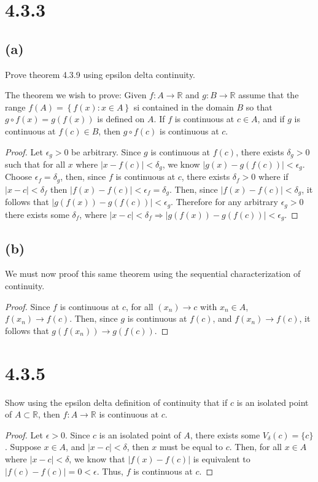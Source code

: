 \documentclass{article}
\begin{document}
\section*{4.3.3}
\subsection*{(a)}
Prove theorem 4.3.9 using epsilon delta continuity.

The theorem we wish to prove:
Given $f: A \rightarrow \mathbb{R}$ and $g: B \rightarrow \mathbb{R}$ assume that the range $f(A) = \left \{ f(x):x \in A \right \}$ si contained in the domain $B$ so that $g \circ f(x) = g(f(x))$ is defined on $A$. If $f$ is continuous at $c \in A$, and if $g$ is continuous at $f(c) \in B$, then $g \circ f(c)$ is continuous at $c$.

\begin{proof}
Let $\epsilon_g > 0$ be arbitrary. Since $g$ is continuous at $f(c)$, there exists $\delta_g > 0$ such that for all $x$ where $|x - f(c)| < \delta_g$, we know $|g(x) -g(f(c))| < \epsilon_g$. Choose $\epsilon_f = \delta_g$, then, since $f$ is continuous at $c$, there exists $\delta_f > 0$ where if $|x-c| < \delta_f$ then $|f(x)-f(c)| < \epsilon_f = \delta_g$. Then, since $|f(x)-f(c)| < \delta_g$, it follows that $|g(f(x)) -g(f(c))| < \epsilon_g$. Therefore for any arbitrary $\epsilon_g > 0$ there exists some $\delta_f$, where $|x-c| < \delta_f \Rightarrow |g(f(x)) - g(f(c))| < \epsilon_g$.
\end{proof}

\subsection*{(b)}
We must now proof this same theorem using the sequential characterization of continuity.

\begin{proof}
Since $f$ is continuous at $c$, for all $(x_n) \rightarrow c$ with $x_n \in A$, $f(x_n) \rightarrow f(c)$. Then, since $g$ is continuous at $f(c)$, and $f(x_n) \rightarrow f(c)$, it follows that $g(f(x_n)) \rightarrow g(f(c))$.
\end{proof}

\section*{4.3.5}
Show using the epsilon delta definition of continuity that if $c$ is an isolated point of $A \subset \mathbb{R}$, then $f:A \rightarrow \mathbb{R}$ is continuous at $c$.
\begin{proof}
Let $\epsilon > 0$. Since $c$ is an isolated point of $A$, there exists some $V_\delta(c) = \{c\}$. Suppose $x \in A$, and $|x-c| < \delta$, then $x$ must be equal to $c$. Then, for all $x \in A$ where $|x-c| < \delta$, we know that $|f(x)-f(c)|$ is equivalent to $|f(c)-f(c)| = 0 < \epsilon$. Thus, $f$ is continuous at $c$.
\end{proof}
\end{document}
